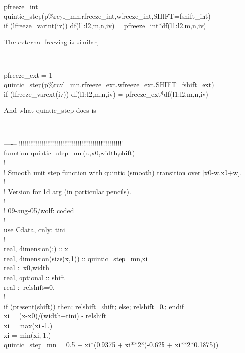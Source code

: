 \documentclass[a4paper,10pt]{article}
\begin{document}
{\tt 
\begin{tabbing}
pfreeze\_int = quintic\_step(p\%rcyl\_mn,rfreeze\_int,wfreeze\_int,SHIFT=fshift\_int)\\
if (lfreeze\_varint(iv)) df(l1:l2,m,n,iv) = pfreeze\_int*df(l1:l2,m,n,iv)
\end{tabbing}
}The external freezing is similar, 
{\tt
\begin{tabbing}
pfreeze\_ext = 1-quintic\_step(p\%rcyl\_mn,rfreeze\_ext,wfreeze\_ext,SHIFT=fshift\_ext)\\
if (lfreeze\_varext(iv)) df(l1:l2,m,n,iv) = pfreeze\_ext*df(l1:l2,m,n,iv)
\end{tabbing}
}

And what quintic\_step does is 

{\tt 
\begin{tabbing}
  ---\=---\=\kill  
!!!!!!!!!!!!!!!!!!!!!!!!!!!!!!!!!!!!!!!!!!!!!!!!!!!!!!!\\
\>      function quintic\_step\_mn(x,x0,width,shift)\\
!\\
!  Smooth unit step function with quintic (smooth) transition over [x0-w,x0+w].\\
!\\
!  Version for 1d arg (in particular pencils).\\
!\\
!  09-aug-05/wolf: coded\\
!\\
        use Cdata, only: tini\\
!\\
  \>\>      real, dimension(:) :: x\\
  \>\>      real, dimension(size(x,1)) :: quintic\_step\_mn,xi\\
  \>\>      real :: x0,width\\
  \>\>      real, optional :: shift\\
  \>\>      real :: relshift=0.\\
!\\
  \>\>      if (present(shift)) then; relshift=shift; else; relshift=0.; endif\\
  \>\>      xi = (x-x0)/(width+tini) - relshift\\
  \>\>      xi = max(xi,-1.)\\
  \>\>      xi = min(xi, 1.)\\
  \>\>      quintic\_step\_mn = 0.5 + xi*(0.9375 + xi**2*(-0.625 + xi**2*0.1875))
\end{tabbing}
}
\end{document}
